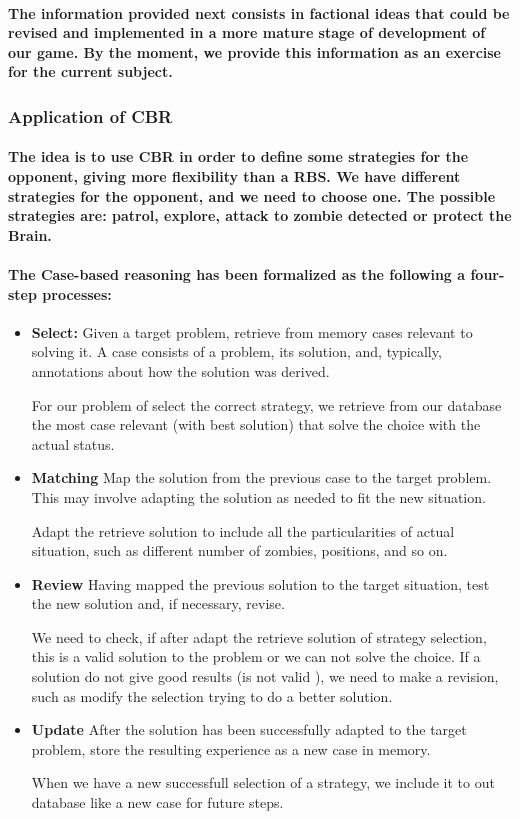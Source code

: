 \documentclass[a4paper,10pt]{article}
\newcommand{\p}[1]{\paragraph{\indent\textnormal{#1}}}
\begin{document}
    \p{The information provided next consists in factional ideas that could be revised and implemented in a more mature stage of development of our game. By the moment, we provide this information as an exercise for the current subject.}

  \subsubsection{Application of CBR}

    \p{The idea is to use CBR in order to define some strategies for the opponent, giving more flexibility than a RBS. We have different strategies for the opponent, and we need to choose one.
	The possible strategies are: \textbf{patrol}, \textbf{explore}, \textbf{attack to zombie detected} or \textbf{protect the Brain}.}

    \p{The Case-based reasoning has been formalized as the following a four-step processes:}

      \begin{itemize}
	\item \textbf{Select:} Given a target problem, retrieve from memory cases relevant to solving it. A case consists of a problem, its solution, and, typically, annotations about how the solution was derived. 

	For our problem of select the correct strategy, we retrieve from our database the most case relevant (with best solution) that solve the choice with the actual status.

	\item \textbf{Matching} Map the solution from the previous case to the target problem. This may involve adapting the solution as needed to fit the new situation.

	Adapt the retrieve solution to include all the particularities of actual situation, such as different number of zombies, positions, and so on.

	\item \textbf{Review} Having mapped the previous solution to the target situation, test the new solution and, if necessary, revise. 

	We need to check, if after adapt the retrieve solution of strategy selection, this is a valid solution to the problem or we can not solve the choice. If a solution do not give good results (is not valid ), we need to make a revision, such as modify the selection trying to do a better solution.

	\item \textbf{Update} After the solution has been successfully adapted to the target problem, store the resulting experience as a new case in memory.

	When we have a new successfull selection of a strategy, we include it to out database like a new case for future steps.

      \end{itemize}
\end{document}
